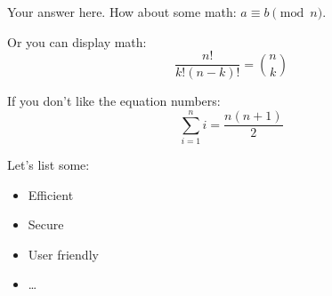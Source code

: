 \documentclass{cpsc413Solutions}
\begin{document}


\begin{problemlist}
\begin{problem}
\begin{answer}
Your answer here.
\newline
How about some math: $a \equiv b \pmod{n}$.

Or you can display math:
\begin{equation}
\frac{n!}{k!(n-k)!} = \binom{n}{k}
\end{equation}

If you don't like the equation numbers:
\begin{equation*}
\sum_{i=1}^n i = \frac{n(n+1)}{2}
\end{equation*}
\end{answer}
\end{problem}


\begin{problem}
\begin{answer}
Let's list some:
\begin{itemize}
\item Efficient
\item Secure
\item User friendly
\item \dots
\end{itemize}
\end{answer}
\end{problem}

\end{problemlist}
\end{document}
